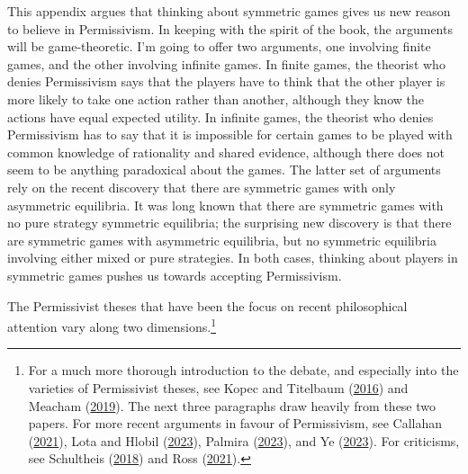 \documentclass[
  12pt,
  letterpaper,
  DIV=11,
  numbers=noendperiod]{scrreprt}
\begin{document}
This appendix argues that thinking about symmetric games gives us new
reason to believe in Permissivism. In keeping with the spirit of the
book, the arguments will be game-theoretic. I'm going to offer two
arguments, one involving finite games, and the other involving infinite
games. In finite games, the theorist who denies Permissivism says that
the players have to think that the other player is more likely to take
one action rather than another, although they know the actions have
equal expected utility. In infinite games, the theorist who denies
Permissivism has to say that it is impossible for certain games to be
played with common knowledge of rationality and shared evidence,
although there does not seem to be anything paradoxical about the games.
The latter set of arguments rely on the recent discovery that there are
symmetric games with only asymmetric equilibria. It was long known that
there are symmetric games with no pure strategy symmetric equilibria;
the surprising new discovery is that there are symmetric games with
asymmetric equilibria, but no symmetric equilibria involving either
mixed or pure strategies. In both cases, thinking about players in
symmetric games pushes us towards accepting Permissivism.

The Permissivist theses that have been the focus on recent philosophical
attention vary along two dimensions.\footnote{For a much more thorough
  introduction to the debate, and especially into the varieties of
  Permissivist theses, see Kopec and Titelbaum
  (\protect\hyperlink{ref-KopecTitelbaum2016}{2016}) and Meacham
  (\protect\hyperlink{ref-Meacham2019}{2019}). The next three paragraphs
  draw heavily from these two papers. For more recent arguments in
  favour of Permissivism, see Callahan
  (\protect\hyperlink{ref-Callahan2021}{2021}), Lota and Hlobil
  (\protect\hyperlink{ref-Lota2023}{2023}), Palmira
  (\protect\hyperlink{ref-Palmira2023}{2023}), and Ye
  (\protect\hyperlink{ref-Ye2023}{2023}). For criticisms, see Schultheis
  (\protect\hyperlink{ref-Schultheis2018}{2018}) and Ross
  (\protect\hyperlink{ref-Ross2021}{2021}).}
\end{document}
